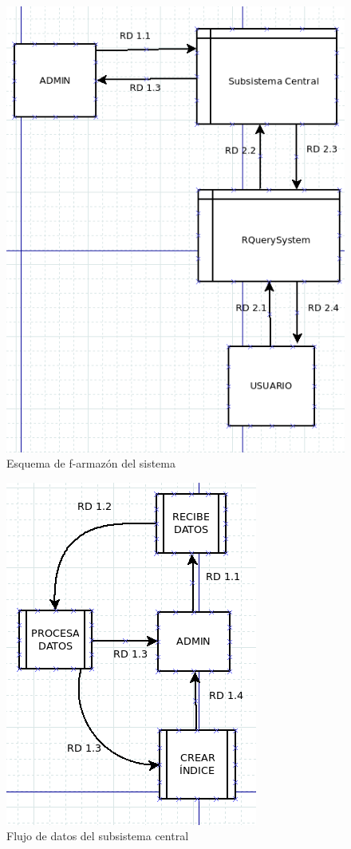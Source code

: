 \begin{figure}[H] %
	\centering
	\includegraphics[scale=0.5]{armazon.png}  %
	\caption{Esquema de f-armazón del sistema} 
\end{figure}

\begin{figure}[H] %
	\centering
	\includegraphics[scale=0.5]{c-fd.png}  %
	\caption{Flujo de datos del subsistema central} 
\end{figure}

